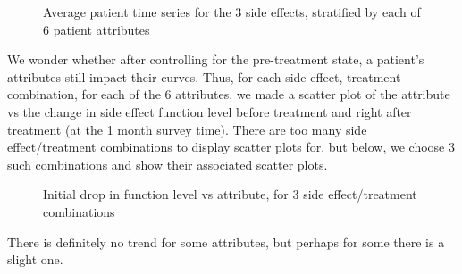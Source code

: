 \begin{figure}
\begin{subfigure}[bowel function]{
  \texttt{[image: /Users/glareprotector/prostate\_git/glare/tex\_files/sections/explore/avg\_time\_series\_strat\_by\_pre\_state/bowel\_func.png]}}
\end{subfigure}
\begin{subfigure}[sexual function]{
  \texttt{[image: /Users/glareprotector/prostate\_git/glare/tex\_files/sections/explore/avg\_time\_series\_strat\_by\_pre\_state/sexual\_func.png]}}
\end{subfigure}
\begin{subfigure}[urinary function]{
  \texttt{[image: /Users/glareprotector/prostate\_git/glare/tex\_files/sections/explore/avg\_time\_series\_strat\_by\_pre\_state/urin\_func.png]}}
\end{subfigure}
\caption{Average patient time series for the 3 side effects, stratified by each of 6 patient attributes}
\end{figure}


We wonder whether after controlling for the pre-treatment state, a patient's attributes still impact their curves.  Thus, for each side effect, treatment combination, for each of the 6 attributes, we made a scatter plot of the attribute vs the change in side effect function level before treatment and right after treatment (at the 1 month survey time).  There are too many side effect/treatment combinations to display scatter plots for, but below, we choose 3 such combinations and show their associated scatter plots.

\begin{figure}
\begin{subfigure}[bowel function/brachytherapy]{
  \texttt{[image: /Users/glareprotector/prostate\_git/glare/tex\_files/sections/explore/change\_in\_state\_vs\_attribute\_by\_treatment/bowel\_func\_brachy.png]}}
\end{subfigure}
\begin{subfigure}[sexual function/surgery]{
  \texttt{[image: /Users/glareprotector/prostate\_git/glare/tex\_files/sections/explore/change\_in\_state\_vs\_attribute\_by\_treatment/sexual\_func\_surgery.png]}}
\end{subfigure}
\begin{subfigure}[urinary function/radiation]{
  \texttt{[image: /Users/glareprotector/prostate\_git/glare/tex\_files/sections/explore/change\_in\_state\_vs\_attribute\_by\_treatment/urin\_func\_radiation.png]}}
\end{subfigure}
\caption{Initial drop in function level vs attribute, for 3 side effect/treatment combinations}
\end{figure}

There is definitely no trend for some attributes, but perhaps for some there is a slight one.